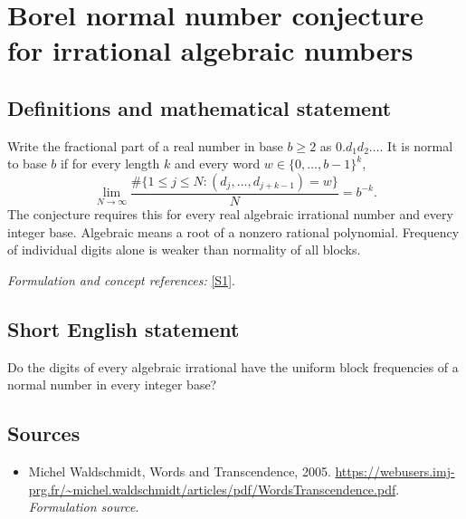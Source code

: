 \documentclass[11pt]{article}
\begin{document}
\section*{\texorpdfstring{Borel normal number conjecture for irrational algebraic numbers}{Borel normal number conjecture for irrational algebraic numbers}}\label{133}
\subsection{Definitions and mathematical statement}
Write the fractional part of a real number in base $b\ge2$ as $0.d_1d_2\ldots$. It is normal to base $b$ if for every length $k$ and every word $w\in\{0,\ldots,b-1\}^k$,
\[
 \lim_{N\to\infty}\frac{\#\{1\le j\le N:(d_j,\ldots,d_{j+k-1})=w\}}{N}=b^{-k}.
\]
The conjecture requires this for every real algebraic irrational number and every integer base. Algebraic means a root of a nonzero rational polynomial. Frequency of individual digits alone is weaker than normality of all blocks.
\par\smallskip\textit{Formulation and concept references:} \href{https://webusers.imj-prg.fr/~michel.waldschmidt/articles/pdf/WordsTranscendence.pdf}{[S1]}.

\subsection{Short English statement}
Do the digits of every algebraic irrational have the uniform block frequencies of a normal number in every integer base?
\subsection{Sources}
\begin{itemize}
\item[S1]Michel Waldschmidt, Words and Transcendence, 2005.
\url{https://webusers.imj-prg.fr/~michel.waldschmidt/articles/pdf/WordsTranscendence.pdf}.
\textit{Formulation source.}
\end{itemize}
\end{document}

